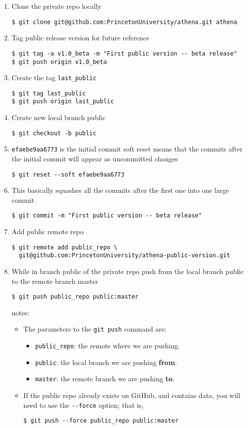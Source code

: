 \documentclass[11pt]{article}
\begin{document}
\begin{enumerate}
\item Clone the private repo locally
\begin{verbatim}
$ git clone git@github.com:PrincetonUniversity/athena.git athena
\end{verbatim}
\item Tag public release version for future reference
\begin{verbatim}
$ git tag -a v1.0_beta -m "First public version -- beta release"
$ git push origin v1.0_beta
\end{verbatim}
\item Create the tag \texttt{last\_public}
\begin{verbatim}
$ git tag last_public
$ git push origin last_public
\end{verbatim}
\item Create new local branch public
\begin{verbatim}
$ git checkout -b public
\end{verbatim}
\item \texttt{efaebe9aa6773} is the initial commit soft reset means
that the commits after the initial commit will appear as uncommitted
changes
\begin{verbatim}
$ git reset --soft efaebe9aa6773
\end{verbatim}
\item This basically squashes all the commits after the first one into
  one large commit
\begin{verbatim}
$ git commit -m "First public version -- beta release"
\end{verbatim}
\item Add public remote repo
\begin{verbatim}
$ git remote add public_repo \
  git@github.com:PrincetonUniversity/athena-public-version.git
\end{verbatim}
\item While in branch public of the private repo push from the local
  branch public to the remote branch master
\begin{verbatim}
$ git push public_repo public:master
\end{verbatim}
notes:
\begin{itemize}
\item The parameters to the \texttt{git push} command are:
\begin{itemize}
\item \texttt{public\_repo}: the remote where we are pushing.
\item \texttt{public}: the local branch we are pushing \textbf{from}.
\item \texttt{master}: the remote branch we are pushing \textbf{to}.
\end{itemize}
\item If the public repo already exists on GitHub, and contains data, 
  you will need to use the \texttt{-{}-force} option; that is,
\begin{verbatim}
$ git push --force public_repo public:master
\end{verbatim}
\end{itemize}
\end{enumerate}
\end{document}
